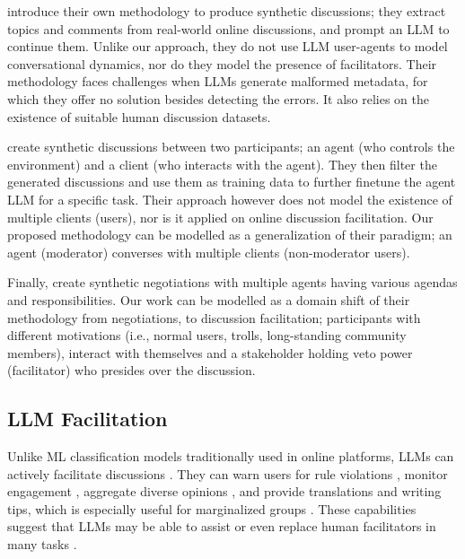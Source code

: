 \citet{balog_2024} introduce their own methodology to produce synthetic discussions; they extract topics and comments from real-world online discussions, and prompt an \ac{LLM} to continue them. Unlike our approach, they do not use \ac{LLM} user-agents to model conversational dynamics, nor do they model the presence of facilitators. Their methodology faces challenges when \acp{LLM} generate malformed metadata, for which they offer no solution besides detecting the errors. It also relies on the existence of suitable human discussion datasets.

\citet{ulmer2024} create synthetic discussions between two participants; an agent (who controls the environment) and a client (who interacts with the agent). They then filter the generated discussions and use them as training data to further finetune the agent \ac{LLM} for a specific task. Their approach however does not model the existence of multiple clients (users), nor is it applied on online discussion facilitation. Our proposed methodology can be modelled as a generalization of their paradigm; an agent (moderator) converses with multiple clients (non-moderator users).

Finally, \citet{abdelnabi_negotiations} create synthetic negotiations with multiple agents having various agendas and responsibilities. Our work can be modelled as a domain shift of their methodology from negotiations, to discussion facilitation; participants with different motivations (i.e., normal users, trolls, long-standing community members), interact with themselves and a stakeholder holding veto power (facilitator) who presides over the discussion.


\subsection{LLM Facilitation}

Unlike \ac{ML} classification models traditionally used in online platforms, \acp{LLM} can actively facilitate discussions \cite{korre2025evaluation}. They can warn users for rule violations \cite{Kumar_AbuHashem_Durumeric_2024}, monitor engagement \cite{schroeder-etal-2024-fora}, aggregate diverse opinions \cite{small-polis-llm}, and provide translations and writing tips, which is especially useful for marginalized groups \cite{Tsai2024Generative}. These capabilities suggest that \acp{LLM} may be able to assist or even replace human facilitators in many tasks \cite{seering_self_moderation}.

